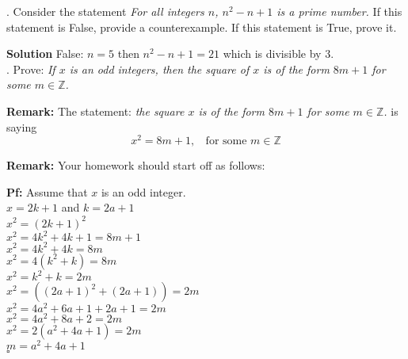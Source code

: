 \documentclass[12pt]{article}
\begin{document}
.  Consider the statement \textit{For all integers $n$, $n^{2} - n + 1$ is a prime number.  }  If this statement is False, provide a counterexample.  If this statement is True, prove it.  
\vspace{.15in}

\textbf{Solution} False: $n=5$ then $n^2-n+1= 21$ which is divisible by 3. \\



.  Prove: \textit{If $x$ is an odd integers, then the square of $x$ is of the form $8m + 1$ for some $m \in \mathbb{Z}$.}
\vspace{.05in}

\noindent \textbf{Remark:}  The statement: \textit{ the square $x$ is of the form $8m + 1$ for some $m \in \mathbb{Z}$.} is saying 
\[
x^{2} = 8m + 1, \;\; \mbox{ for some } m \in \mathbb{Z}
\]


\noindent \textbf{Remark:} Your homework should start off as follows:
\vspace{.05in}

\noindent \textbf{Pf:}  Assume that $x$ is an odd integer.  \\ 
\indent $x = 2k+1$ and $k = 2a+1$ \\ 
\indent $x^2 = (2k+1)^2$ \\
\indent $x^2 = 4k^2 + 4k + 1 = 8m + 1$ \\ 
\indent $x^2 = 4k^2 + 4k = 8m$ \\ 
\indent $x^2 = 4(k^2 + k) = 8m$ \\
\indent $x^2 = k^2 + k = 2m$ \\
\indent $x^2 = ((2a+1)^2 +(2a+1))= 2m$\\
\indent $x^2 = 4a^2 + 6a + 1 + 2a + 1= 2m$\\
\indent $x^2 = 4a^2 +8a + 2= 2m$ \\
\indent $x^2 = 2(a^2 + 4a +1)= 2m$\\
\indent $ m = a^2 + 4a + 1$\\
$\square$
\vspace{.15in}
\end{document}
